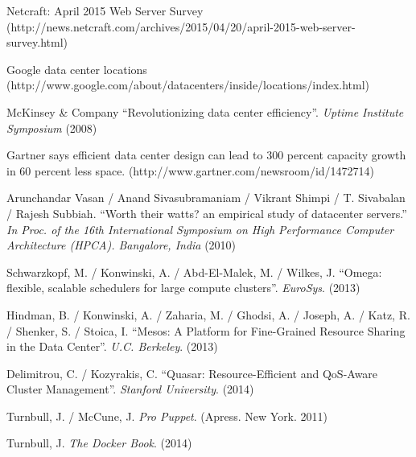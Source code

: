\documentclass[a4paper,12pt,spanish,final]{epsc_tfc_pfc}
\begin{document}
\begin{thebibliography}{2}


Netcraft: April 2015 Web Server Survey (http://news.netcraft.com/archives/2015/04/20/april-2015-web-server-survey.html)

Google data center locations (http://www.google.com/about/datacenters/inside/locations/index.html)

McKinsey \& Company ``Revolutionizing data center efficiency''. {\it Uptime Institute Symposium}
(2008)

Gartner says efficient data center design can lead to 300 percent capacity growth in 60 percent less space. (http://www.gartner.com/newsroom/id/1472714)

Arunchandar Vasan / Anand Sivasubramaniam / Vikrant Shimpi / T. Sivabalan / Rajesh Subbiah. ``Worth their watts? an empirical study of datacenter servers.'' {\it In Proc. of the 16th International Symposium on High Performance Computer Architecture (HPCA). Bangalore, India} (2010)

Schwarzkopf, M. / Konwinski, A. / Abd-El-Malek, M. / Wilkes, J.
``Omega: flexible, scalable schedulers for large compute clusters''. {\it EuroSys}.
(2013)

Hindman, B. / Konwinski, A. / Zaharia, M. / Ghodsi, A. / Joseph, A. / Katz, R. / Shenker, S. / Stoica, I.
``Mesos: A Platform for Fine-Grained Resource Sharing in the Data Center''. {\it U.C. Berkeley}.
(2013)

Delimitrou, C. / Kozyrakis, C.
``Quasar: Resource-Efficient and QoS-Aware Cluster Management''. {\it Stanford University}.
(2014)

Turnbull, J. / McCune, J.
{\it Pro Puppet}.
(Apress. New York. 2011)

Turnbull, J.
{\it The Docker Book}.
(2014)

\end{thebibliography}
\end{document}
